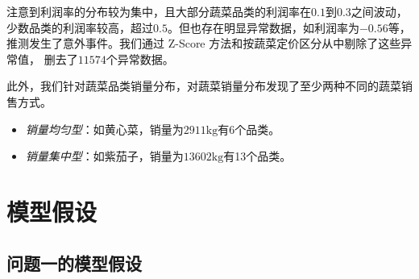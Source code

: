 \documentclass{article}
\begin{document}
注意到利润率的分布较为集中，且大部分蔬菜品类的利润率在$0.1$到$0.3$之间波动，少数品类的利润率较高，超过$0.5$。但也存在明显异常数据，如利润率为$-0.56$等，推测发生了意外事件。我们通过 Z-Score 方法和按蔬菜定价区分从中剔除了这些异常值，
删去了$11574$个异常数据。

此外，我们针对蔬菜品类销量分布，对蔬菜销量分布发现了至少两种不同的蔬菜销售方式。
\begin{itemize}
    \item \textit{销量均匀型}：如黄心菜，销量为$2911 \text{kg}$有6个品类。
    \item \textit{销量集中型}：如紫茄子，销量为$13602 \text{kg}$有13个品类。
\end{itemize}
\section{模型假设}

\subsection{问题一的模型假设}
\end{document}

